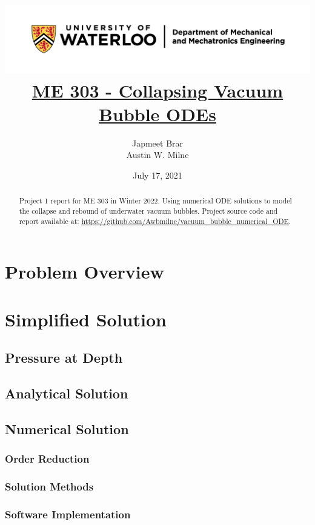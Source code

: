 \documentclass[12pt]{article}
\title{
    \includegraphics[width=\linewidth]{resources/uwaterloo_mechanical_and_mechatronics_engineering/UWaterloo_Mechanical_Mechatronics_Eng_Logo_horiz_rgb.png}
    \\[1cm]
    \underline{\bf{ME 303 - Collapsing Vacuum Bubble ODEs}}
}
\author{
    Japmeet Brar\\
    Austin W. Milne
}
\date{July 17, 2021}
\begin{document}
\maketitle
\vfill
\begin{abstract}
    Project 1 report for ME 303 in Winter 2022. Using numerical ODE solutions to model the collapse and rebound of underwater vacuum bubbles. Project source code and report available at:
    \underline{\url{https://github.com/Awbmilne/vacuum_bubble_numerical_ODE}}.
\end{abstract}
\newpage

\tableofcontents
\listoftables
\listoffigures
\lstlistoflistings

\newpage


\section{Problem Overview}

\section{Simplified Solution}
\subsection{Pressure at Depth}
\subsection{Analytical Solution}
\subsection{Numerical Solution}
\subsubsection{Order Reduction}
\subsubsection{Solution Methods}
\subsubsection{Software Implementation}
\end{document}
